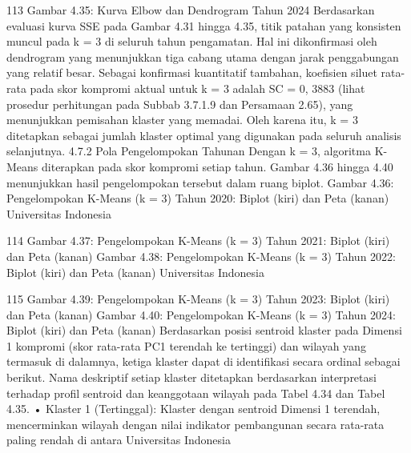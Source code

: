 113
Gambar 4.35: Kurva Elbow dan Dendrogram Tahun 2024
Berdasarkan evaluasi kurva SSE pada Gambar 4.31 hingga 4.35, titik patahan yang
konsisten muncul pada k = 3 di seluruh tahun pengamatan. Hal ini dikonfirmasi oleh
dendrogram yang menunjukkan tiga cabang utama dengan jarak penggabungan yang
relatif besar. Sebagai konfirmasi kuantitatif tambahan, koefisien siluet rata-rata pada skor
kompromi aktual untuk k = 3 adalah SC = 0, 3883 (lihat prosedur perhitungan pada
Subbab 3.7.1.9 dan Persamaan 2.65), yang menunjukkan pemisahan klaster yang memadai.
Oleh karena itu, k = 3 ditetapkan sebagai jumlah klaster optimal yang digunakan pada
seluruh analisis selanjutnya.
4.7.2 Pola Pengelompokan Tahunan
Dengan k = 3, algoritma K-Means diterapkan pada skor kompromi setiap tahun.
Gambar 4.36 hingga 4.40 menunjukkan hasil pengelompokan tersebut dalam ruang biplot.
Gambar 4.36: Pengelompokan K-Means (k = 3) Tahun 2020: Biplot (kiri) dan Peta
(kanan)
Universitas Indonesia

114
Gambar 4.37: Pengelompokan K-Means (k = 3) Tahun 2021: Biplot (kiri) dan Peta
(kanan)
Gambar 4.38: Pengelompokan K-Means (k = 3) Tahun 2022: Biplot (kiri) dan Peta
(kanan)
Universitas Indonesia

115
Gambar 4.39: Pengelompokan K-Means (k = 3) Tahun 2023: Biplot (kiri) dan Peta
(kanan)
Gambar 4.40: Pengelompokan K-Means (k = 3) Tahun 2024: Biplot (kiri) dan Peta
(kanan)
Berdasarkan posisi sentroid klaster pada Dimensi 1 kompromi (skor rata-rata PC1
terendah ke tertinggi) dan wilayah yang termasuk di dalamnya, ketiga klaster dapat diidentifikasi secara ordinal sebagai berikut. Nama deskriptif setiap klaster ditetapkan
berdasarkan interpretasi terhadap profil sentroid dan keanggotaan wilayah pada Tabel 4.34
dan Tabel 4.35.
• Klaster 1 (Tertinggal): Klaster dengan sentroid Dimensi 1 terendah, mencerminkan
wilayah dengan nilai indikator pembangunan secara rata-rata paling rendah di antara
Universitas Indonesia

